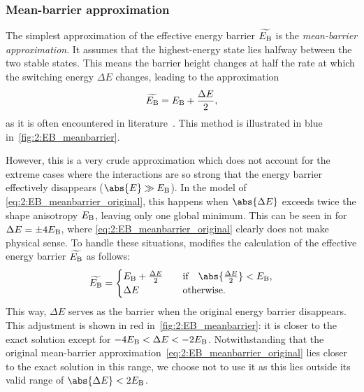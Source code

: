 \subsubsection{Mean-barrier approximation}
The simplest approximation of the effective energy barrier $\widetilde{E_\mathrm{B}}$ is the \textit{mean-barrier approximation}.
It assumes that the highest-energy state lies halfway between the two stable states.
This means the barrier height changes at half the rate at which the switching energy $\Delta E$ changes, leading to the approximation
\begin{equation}
	\label{eq:2:EB_meanbarrier_original}
	\widetilde{E_\mathrm{B}} = E_\mathrm{B} + \frac{\Delta E}{2} \mathrm{,}
\end{equation}
as it is often encountered in literature~\cite{MC_TemperatureDesorption,DirectionalEnergyBarrier}.
This method is illustrated in blue in~\cref{fig:2:EB_meanbarrier}. \par
However, this is a very crude approximation which does not account for the extreme cases where the interactions are so strong that the energy barrier effectively disappears ($\abs{E} \gg \EB$).
In the model of \cref{eq:2:EB_meanbarrier_original}, this happens when $\abs{\Delta E}$ exceeds twice the shape anisotropy $E_\mathrm{B}$, leaving only one global minimum.
This can be seen in  for $\Delta E = \pm 4 E_\mathrm{B}$, where \cref{eq:2:EB_meanbarrier_original} clearly does not make physical sense.
To handle these situations, \hotspice modifies the calculation of the effective energy barrier $\widetilde{E_\mathrm{B}}$ as follows:
\begin{equation}
	\label{eq:2:EB_meanbarrier_cases}
	\widetilde{E_\mathrm{B}} = \begin{cases}
		E_\mathrm{B} + \frac{\Delta E}{2} & \quad \text{if} \quad \abs{\frac{\Delta E}{2}} < E_\mathrm{B}, \\
		\Delta E & \quad \text{otherwise}.
	\end{cases}
\end{equation}
This way, $\Delta E$ serves as the barrier when the original energy barrier disappears.
This adjustment is shown in red in~\cref{fig:2:EB_meanbarrier}: it is closer to the exact solution except for $-4 E_\mathrm{B} < \Delta E < -2 E_\mathrm{B}$.
Notwithstanding that the original mean-barrier approximation~\eqref{eq:2:EB_meanbarrier_original} lies closer to the exact solution in this range, we choose not to use it as this lies outside its valid range of $\abs{\Delta E} < 2 \EB$.

